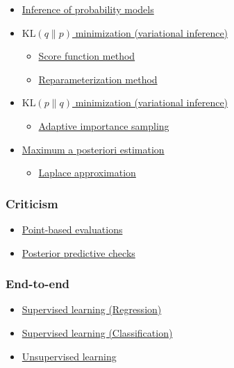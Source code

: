 \begin{itemize}
  \item \href{tut_inference.html}{Inference of probability models}
  \item \href{tut_KLqp.html}{$\text{KL}(q\|p)$ minimization (variational
  inference)}
  \begin{itemize}
    \item \href{tut_KLqp_score.html}{Score function method}
    \item \href{tut_KLqp_reparam.html}{Reparameterization method}
  \end{itemize}
  \item \href{tut_KLpq.html}{$\text{KL}(p\|q)$ minimization (variational
  inference)}
  \begin{itemize}
    \item \href{tut_KLpq_ais.html}{Adaptive importance sampling}
  \end{itemize}
  \item \href{tut_MAP.html}{Maximum a posteriori estimation}
  \begin{itemize}
    \item \href{tut_MAP_Laplace.html}{Laplace approximation}
  \end{itemize}
\end{itemize}

\subsubsection{Criticism}

\begin{itemize}
  \item \href{tut_point_eval.html}{Point-based evaluations}
  \item \href{tut_PPC.html}{Posterior predictive checks}
\end{itemize}

\subsubsection{End-to-end}

\begin{itemize}
  \item \href{tut_supervised_regression.html}{Supervised learning (Regression)}
  \item \href{tut_supervised_classification.html}{Supervised learning (Classification)}
  \item \href{tut_unsupervised.html}{Unsupervised learning}
\end{itemize}
